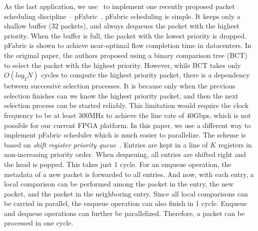  As the last application, we use \name\ to implement one recently proposed packet
scheduling discipline -- pFabric~\cite{pfabric}. 
pFabric scheduling is simple. It keeps only a shallow buffer (32 packets), and always dequeues the
packet with the highest priority. When the buffer is full, the packet with the lowest priority is dropped.
%
pFabric is shown to achieve near-optimal flow completion time in datacenters. 
%
In the original paper, the authors proposed using a binary comparison tree (BCT) to select the packet with the highest priority. 
However, while BCT takes only $O(log_2N)$ cycles to compute the highest priority packet, there is a dependency between 
successive selection processes. It is because only when the previous selection finishes can we know the highest priority packet, and
then the next selection process can be started reliably.
This limitation would require the clock frequency to be at least 300MHz to achieve the line rate of 40Gbps, 
which is not possible for our current FPGA platform.
%
In this paper, we use a different way to implement pFabric scheduler which is much easier to  parallelize. 
The scheme is based on \textit{shift register priority queue}~\cite{moon2000scalable}.
Entries are kept in a line of $K$ registers in non-increasing priority order.
When dequeuing, all entries are shifted right and the head is popped. This takes just 1 cycle.
For an enqueue operation, the metadata of a new packet is forwarded to all entries.
And now, with each entry, a local comparison can be performed among 
the packet in the entry, the new packet, and the packet in the neighboring entry. 
Since all local comparisons can be carried in parallel, the enqueue operation can 
also finish in 1 cycle.
Enqueue and dequeue operations can further be parallelized. 
Therefore, a packet can be processed in one cycle.


